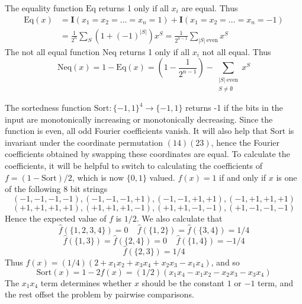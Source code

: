 \begin{example}
    The equality function $\text{Eq}$ returns 1 only if all $x_i$ are equal. Thus
    \begin{align*}
        \text{Eq}(x) &= \mathbf{I}(x_1 = x_2 = \dots = x_n = 1) + \mathbf{I}(x_1 = x_2 = \dots = x_n = -1)\\
        &= \frac{1}{2^n} \sum_S (1 + (-1)^{|S|}) x^S = \frac{1}{2^{n-1}} \sum_{|S|\ \text{even}} x^S
    \end{align*}
    The not all equal function $\text{Neq}$ returns 1 only if all $x_i$ not all equal. Thus
    \[ \text{Neq}(x) = 1 - \text{Eq}(x) = \left( 1 - \frac{1}{2^{n-1}} \right) - \sum_{\substack{|S|\ \text{even}\\S \neq \emptyset}} x^S \]
\end{example}

\begin{example}
    The sortedness function $\text{Sort} : \{ -1, 1 \}^4 \to \{ -1, 1 \}$ returns -1 if the bits in the input are monotonically increasing or monotonically decreasing. Since the function is even, all odd Fourier coefficients vanish. It will also help that $\text{Sort}$ is invariant under the coordinate permutation $(1 4)(2 3)$, hence the Fourier coefficients obtained by swapping these coordinates are equal. To calculate the coefficients, it will be helpful to switch to calculating the coefficients of $f = (1 - \text{Sort})/2$, which is now $\{ 0, 1 \}$ valued. $f(x) = 1$ if and only if $x$ is one of the following 8 bit strings
    \[ (-1,-1,-1,-1), (-1,-1,-1,+1), (-1,-1,+1,+1), (-1,+1,+1,+1) \]
    \[ (+1,+1,+1,+1), (+1,+1,+1,-1), (+1,+1,-1,-1), (+1,-1,-1,-1) \]
    Hence the expected value of $f$ is $1/2$. We also calculate that
    \[ \widehat{f}(\{1,2,3,4\}) = 0\ \ \ \ \ \widehat{f}(\{1,2\}) = \widehat{f}(\{3,4\}) = 1/4 \]
    \[ \widehat{f}(\{ 1, 3 \}) = \widehat{f}(\{2,4\}) = 0\ \ \ \ \ \widehat{f}(\{1,4\}) = -1/4 \]
    \[ \widehat{f}(\{2,3\}) = 1/4 \]
    Thus $f(x) = (1/4)(2 + x_1x_2 + x_3x_4 + x_2x_3 - x_1x_4)$, and so
    \[ \text{Sort}(x) = 1 - 2f(x) = (1/2)(x_1x_4 - x_1x_2 - x_2x_3 - x_3x_4) \]
    The $x_1x_4$ term determines whether $x$ should be the constant $1$ or $-1$ term, and the rest offset the problem by pairwise comparisons.
\end{example}

